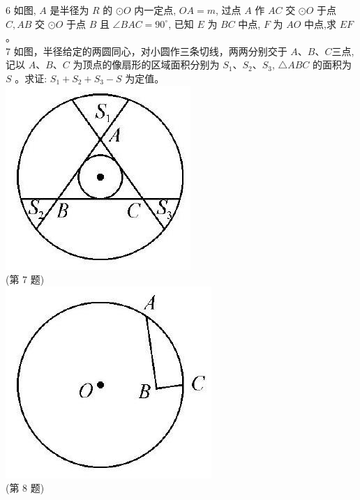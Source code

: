 \documentclass[10pt]{article}
\begin{document}
6 如图, $A$ 是半径为 $R$ 的 $\odot O$ 内一定点, $O A=m$, 过点 $A$ 作 $A C$ 交 $\odot O$ 于点 $C, A B$ 交 $\odot O$ 于点 $B$ 且 $\angle B A C=90^{\circ}$, 已知 $E$ 为 $B C$ 中点, $F$ 为 $A O$ 中点,求 $E F$ 。\\
7 如图，半径给定的两圆同心，对小圆作三条切线，两两分别交于 $A 、 B 、 C$三点, 记以 $A 、 B 、 C$ 为顶点的像扇形的区域面积分别为 $S_{1} 、 S_{2} 、 S_{3}$, $\triangle A B C$ 的面积为 $S$ 。求证: $S_{1}+S_{2}+S_{3}-S$ 为定值。\\
\includegraphics[max width=\textwidth, center]{2024_10_30_66b8e5e701da2093c133g-021(1)}\\
(第 7 题)\\
\includegraphics[max width=\textwidth, center]{2024_10_30_66b8e5e701da2093c133g-021(3)}\\
(第 8 题)
\end{document}
